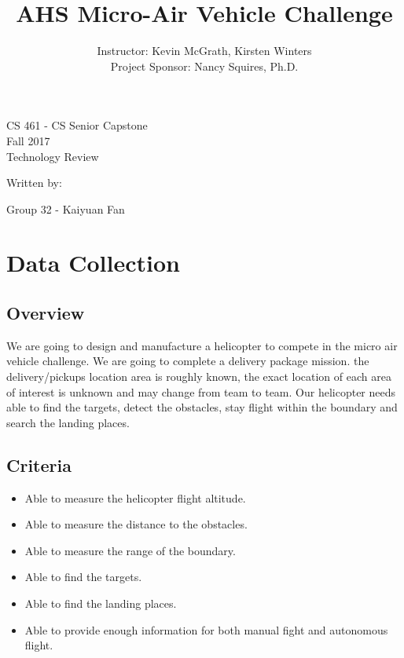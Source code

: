 \documentclass[letterpaper, 10, draftclsnofoot, onecolumn,compsoc]{IEEEtran}
\title{AHS Micro-Air Vehicle Challenge}
\author{ Instructor: Kevin McGrath, Kirsten Winters \\
    Project Sponsor: Nancy Squires, Ph.D.
}
\def\class{CS 461 - CS Senior Capstone}
\def\term{Fall 2017}
\begin{document}
\null  
\nointerlineskip  %
\vfill
\let\snewpage \newpage
\let\newpage \relax
\maketitle
\begin{center}
\class\\
\term\\
\huge{Technology Review}\par
\vspace{2mm}
\large{Written by:}\par
\normalsize{Group 32 - Kaiyuan Fan}\par
\vspace{8mm}
\end{center}

\let \newpage \snewpage
\vfill 
\break %

\tableofcontents

\newpage
\section{Data Collection}
\subsection{Overview}
We are going to design and manufacture a helicopter to compete in the micro air vehicle challenge. We are going to complete a delivery package mission. the delivery/pickups location area is roughly known, the exact location of each area of interest is unknown and may change from team to team. Our helicopter needs able to find the targets, detect the obstacles, stay flight within the boundary and search the landing places.


\subsection{Criteria}
\begin{itemize} 
\item Able to measure the helicopter flight altitude.
\item Able to measure the distance to the obstacles.
\item Able to measure the range of the boundary.
\item Able to find the targets.
\item Able to find the landing places.
\item Able to provide enough information for both manual fight and autonomous flight.
\end{itemize}
\end{document}
